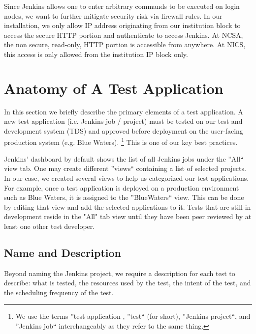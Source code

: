 \documentclass[10pt, conference, compsocconf]{IEEEtran}
\begin{document}
Since Jenkins allows one to enter arbitrary commands to be executed on login nodes, we want to further mitigate security risk via firewall rules. 
In our installation, we only allow IP address originating from our institution block to access the secure HTTP portion and authenticate to access Jenkins. 
At NCSA, the non secure, read-only, HTTP portion is accessible from anywhere. 
At NICS, this access is only allowed from the institution IP block only. 


\section{Anatomy of A Test Application}
\label{sec:TestAnatomy}
In this section we briefly describe the primary elements of a test application. 
A new test application (i.e. Jenkins job / project) must be tested on our test and development system (TDS) and approved before deployment on the user-facing production system (e.g. Blue Waters). 
\footnote{We use the terms ''test application , ''test`` (for short), ''Jenkins project``, and ''Jenkins job`` interchangeably as they refer to the same thing.}
This is one of our key best practices. 

Jenkins' dashboard by default shows the list of all Jenkins jobs under the ''All`` view tab. 
One may create different ''views`` containing a list of selected projects. 
In our case, we created several views to help us categorized our test applications.
For example, once a test application is deployed on a production environment such as Blue Waters, it is assigned to the ''BlueWaters`` view. 
This can be done by editing that view and add the selected applications to it.
Tests that are still in development reside in the "All" tab view until they have been peer reviewed by at least one other test developer.

\subsection{Name and Description}
Beyond naming the Jenkins project, we require a description for each test to describe: what is tested, the resources used by the test, the intent of the test, and the scheduling frequency of the test.
\end{document}
